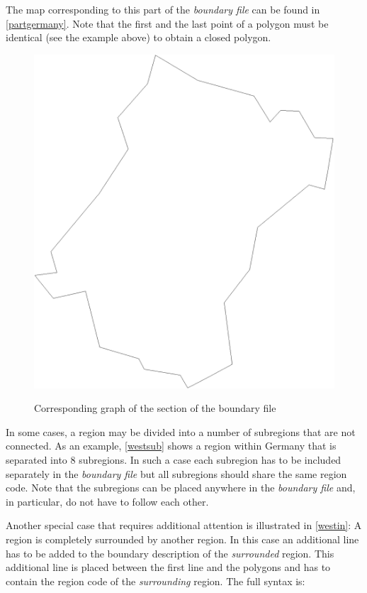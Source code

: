 \vspace{0.3cm}

The  map corresponding to this part of the {\em boundary file} can be found in \autoref{partgermany}. Note that the first and the last point of a polygon must be identical (see the example above) to obtain a closed polygon.


\begin{figure}[ht]
\centering
\includegraphics [scale=0.3]{grafiken/westpart.eps}
{\em\caption{\label{partgermany} Corresponding graph of the section of the boundary file}}
\end{figure}

In some cases, a region may be divided into a number of subregions that are not connected. As an example, \autoref{westsub} shows a region within Germany that is separated into 8 subregions. In such a case each subregion has to be included separately in the {\em boundary file} but all subregions should share the same region code. Note that the subregions can be placed anywhere in the {\em boundary file} and, in particular, do not have to follow each other.

Another special case that requires additional attention is illustrated in \autoref{westin}: A region is completely surrounded by another region. In this case an additional line has to be added to the boundary description of the {\em surrounded} region. This additional line is placed between the first line and the polygons and has to contain the region code of the {\em surrounding} region. The full syntax is:

